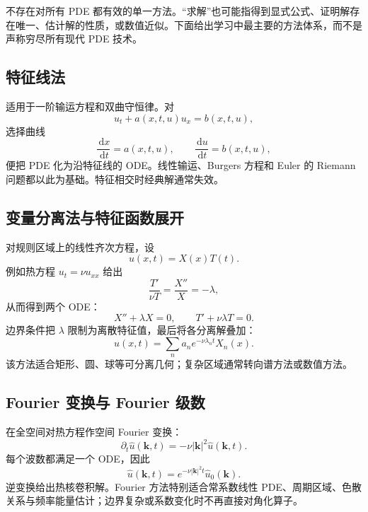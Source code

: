 \documentclass[cn,hazy,blue,11pt,normal]{elegantnote}
\numberwithin{equation}{section}
\newcommand{\dd}{\,\mathrm d}
\newcommand{\vct}[1]{\bm{#1}}
\begin{document}
不存在对所有 PDE 都有效的单一方法。“求解”也可能指得到显式公式、证明解存在唯一、估计解的性质，或数值近似。下面给出学习中最主要的方法体系，而不是声称穷尽所有现代 PDE 技术。

\subsection{特征线法}

适用于一阶输运方程和双曲守恒律。对
\begin{equation}
 u_t+a(x,t,u)u_x=b(x,t,u),
\end{equation}
选择曲线
\begin{equation}
 \frac{\dd x}{\dd t}=a(x,t,u),
 \qquad \frac{\dd u}{\dd t}=b(x,t,u),
\end{equation}
便把 PDE 化为沿特征线的 ODE。线性输运、Burgers 方程和 Euler 的 Riemann 问题都以此为基础。特征相交时经典解通常失效。

\subsection{变量分离法与特征函数展开}

对规则区域上的线性齐次方程，设
\begin{equation}
 u(x,t)=X(x)T(t).
\end{equation}
例如热方程 $u_t=\nu u_{xx}$ 给出
\begin{equation}
 \frac{T'}{\nu T}=\frac{X''}{X}=-\lambda,
\end{equation}
从而得到两个 ODE：
\begin{equation}
 X''+\lambda X=0,
 \qquad T'+\nu\lambda T=0.
\end{equation}
边界条件把 $\lambda$ 限制为离散特征值，最后将各分离解叠加：
\begin{equation}
 u(x,t)=\sum_na_ne^{-\nu\lambda_nt}X_n(x).
\end{equation}
该方法适合矩形、圆、球等可分离几何；复杂区域通常转向谱方法或数值方法。

\subsection{Fourier 变换与 Fourier 级数}

在全空间对热方程作空间 Fourier 变换：
\begin{equation}
 \partial_t\widehat u(\vct k,t)
 =-\nu|\vct k|^2\widehat u(\vct k,t).
\end{equation}
每个波数都满足一个 ODE，因此
\begin{equation}
 \boxed{\widehat u(\vct k,t)
 =e^{-\nu|\vct k|^2t}\widehat u_0(\vct k).} \label{eq:heat-fourier}
\end{equation}
逆变换给出热核卷积解。Fourier 方法特别适合常系数线性 PDE、周期区域、色散关系与频率能量估计；边界复杂或系数变化时不再直接对角化算子。
\end{document}
